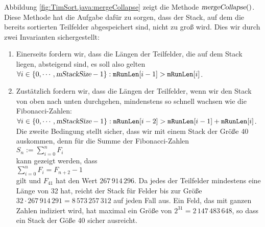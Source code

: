 Abbildung \ref{fig:TimSort.java:mergeCollapse} zeigt die Methode $\textsl{mergeCollapse}()$.  Diese
Methode hat die Aufgabe daf\"ur zu sorgen, dass der Stack, auf dem die bereits sortierten Teilfelder
abgespeichert sind, nicht zu gro{\ss} wird.  Dies wir durch zwei Invarianten sichergestellt:
\begin{enumerate}
\item Einerseits fordern wir, dass die L\"angen der Teilfelder, die auf dem Stack liegen, absteigend
      sind, es soll also gelten
      \\[0.2cm]
      \hspace*{1.3cm}
      $\forall i \in \{0, \cdots, \textsl{mStackSize} - 1\}: \mathtt{mRunLen}[i-1] > \mathtt{mRunLen}[i]$.
\item Zust\"atzlich fordern wir, dass die L\"angen der Teilfelder, wenn wir den Stack von oben nach
      unten durchgehen, mindenstens so schnell wachsen wie die Fibonacci-Zahlen:  
      \\[0.2cm]
      \hspace*{1.3cm}
      $\forall i \in \{0, \cdots, \textsl{mStackSize} - 1\}: 
        \mathtt{mRunLen}[i-2] > \mathtt{mRunLen}[i-1] + \mathtt{mRunLen}[i]$.
      \\[0.2cm]
      Die zweite Bedingung stellt sicher, dass wir mit einem Stack der Gr\"o{\ss}e 40 auskommen, denn f\"ur die
      Summe der Fibonacci-Zahlen
      \\[0.2cm]
      \hspace*{1.3cm}
      $S_n := \sum\limits_{i=0}^n F_i$
      \\[0.2cm]
      kann gezeigt werden, dass
      \\[0.2cm]
      \hspace*{1.3cm}
      $\sum\limits_{i=0}^n F_i = F_{n+2} - 1$
      \\[0.2cm]
      gilt und  $F_{41}$ hat den Wert $267\,914\,296$.  Da jedes der Teilfelder mindestens eine
      L\"ange von 32 hat, reicht der Stack f\"ur Felder bis zur Gr\"o{\ss}e 
      $32 \cdot 267\,914\,291 = 8\,573\,257\,312$ auf jeden Fall aus.  Ein Feld, das mit ganzen
      Zahlen indiziert wird, hat maximal ein Gr\"o{\ss}e von $2^{31} = 2\,147\,483\,648$,
      so dass ein Stack der G\"o{\ss}e 40 sicher ausreicht.
\end{enumerate}

